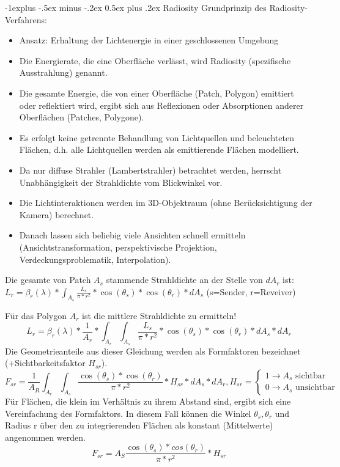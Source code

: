 \documentclass[10pt,landscape]{article}
\makeatletter
\renewcommand{\subsection}{\@startsection{subsection}{2}{0mm}%
                                {-1explus -.5ex minus -.2ex}%
                                {0.5ex plus .2ex}%
                                {\normalfont\normalsize\bfseries}}
\makeatother
\begin{document}
\begin{multicols}{3}
\subsection{ Radiosity}
Grundprinzip des Radiosity-Verfahrens:
\begin{itemize}
  \item Ansatz: Erhaltung der Lichtenergie in einer geschlossenen Umgebung
  \item Die Energierate, die eine Oberfläche verlässt, wird Radiosity (spezifische Ausstrahlung) genannt.
  \item Die gesamte Energie, die von einer Oberfläche (Patch, Polygon) emittiert oder reflektiert wird, ergibt sich aus Reflexionen oder Absorptionen anderer Oberflächen (Patches, Polygone).
  \item Es erfolgt keine getrennte Behandlung von Lichtquellen und beleuchteten Flächen, d.h. alle Lichtquellen werden als emittierende Flächen modelliert.
  \item Da nur diffuse Strahler (Lambertstrahler) betrachtet werden, herrscht Unabhängigkeit der Strahldichte vom Blickwinkel vor.
  \item Die Lichtinteraktionen werden im 3D-Objektraum (ohne Berücksichtigung der Kamera) berechnet.
  \item Danach lassen sich beliebig viele Ansichten schnell ermitteln (Ansichtstransformation, perspektivische Projektion, Verdeckungsproblematik, Interpolation).
\end{itemize}

Die gesamte von Patch $A_s$ stammende Strahldichte an der Stelle von $dA_r$ ist: $L_r=\beta_r(\lambda)*\int_{A_s}\frac{L_s}{\pi * r^2}*\cos(\theta_s)*\cos(\theta_r)*dA_s$ (s=Sender, r=Reveiver)

Für das Polygon $A_r$ ist die mittlere Strahldichte zu ermitteln!
$$L_r=\beta_r(\lambda)*\frac{1}{A_r}*\int_{A_r}\int_{A_s}\frac{L_s}{\pi*r^2}*\cos(\theta_s)*\cos(\theta_r)*dA_s*dA_r$$
Die Geometrieanteile aus dieser Gleichung werden als Formfaktoren bezeichnet (+Sichtbarkeitsfaktor $H_{sr}$).
$$F_{sr}=\frac{1}{A_R}\int_{A_r}\int_{A_s}\frac{\cos(\theta_s)*\cos(\theta_r)}{\pi*r^2}*H_{sr}*dA_s*dA_r, H_{sr}=\begin{cases}1\rightarrow A_s \text{ sichtbar}\\ 0\rightarrow A_s \text{ unsichtbar}\end{cases}$$
Für Flächen, die klein im Verhältnis zu ihrem Abstand sind, ergibt sich eine Vereinfachung des Formfaktors. In diesem Fall können die Winkel $\theta_s,\theta_r$ und Radius r über den zu integrierenden Flächen als konstant (Mittelwerte) angenommen werden.
$$F_{sr}=A_S \frac{\cos(\theta_s)*cos(\theta_r)}{\pi*r^2}*H_{sr}$$


\end{multicols}
\end{document}
